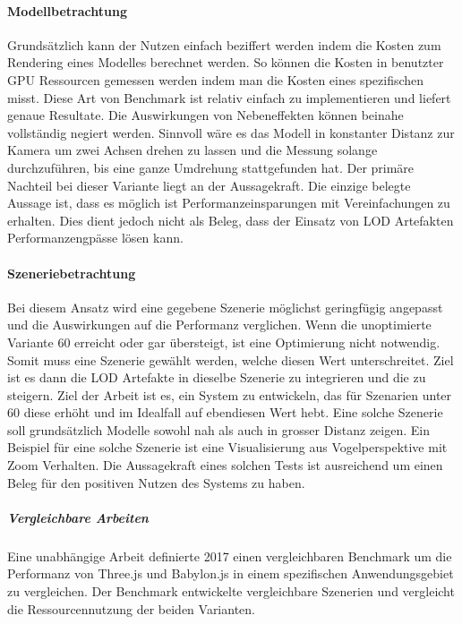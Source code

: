 \paragraph{Modellbetrachtung}
Grundsätzlich kann der Nutzen einfach beziffert werden indem die Kosten zum Rendering eines Modelles berechnet werden. So können die Kosten in benutzter GPU Ressourcen gemessen werden indem man die Kosten eines spezifischen  misst. Diese Art von Benchmark ist relativ einfach zu implementieren und liefert genaue Resultate. Die Auswirkungen von Nebeneffekten können beinahe vollständig negiert werden.
Sinnvoll wäre es das Modell in konstanter Distanz zur Kamera um zwei Achsen drehen zu lassen und die Messung solange durchzuführen, bis eine ganze Umdrehung stattgefunden hat.
Der primäre Nachteil bei dieser Variante liegt an der Aussagekraft. Die einzige belegte Aussage ist, dass es möglich ist Performanzeinsparungen mit Vereinfachungen zu erhalten. Dies dient jedoch nicht als Beleg, dass der Einsatz von LOD Artefakten Performanzengpässe lösen kann.

\paragraph{Szeneriebetrachtung}
Bei diesem Ansatz wird eine gegebene Szenerie möglichst geringfügig angepasst und die Auswirkungen auf die Performanz verglichen.
Wenn die unoptimierte Variante 60  erreicht oder gar übersteigt, ist eine Optimierung nicht notwendig. Somit muss eine Szenerie gewählt werden, welche diesen Wert unterschreitet. 
Ziel ist es dann die LOD Artefakte in dieselbe Szenerie zu integrieren und die  zu steigern. Ziel der Arbeit ist es, ein System zu entwickeln, das für Szenarien unter 60  diese erhöht und im Idealfall auf ebendiesen Wert hebt.
Eine solche Szenerie soll grundsätzlich Modelle sowohl nah als auch in grosser Distanz zeigen. Ein Beispiel für eine solche Szenerie ist eine Visualisierung aus  Vogelperspektive mit Zoom Verhalten.
Die Aussagekraft eines solchen Tests ist ausreichend um einen Beleg für den positiven Nutzen des Systems zu haben.

\subparagraph{Vergleichbare Arbeiten}
Eine unabhängige Arbeit definierte 2017 einen vergleichbaren Benchmark um die Performanz von Three.js und Babylon.js in einem spezifischen Anwendungsgebiet zu vergleichen. Der Benchmark entwickelte vergleichbare Szenerien und vergleicht die Ressourcennutzung der beiden Varianten. \cite{performanceComparisonBabylonThreejs}
